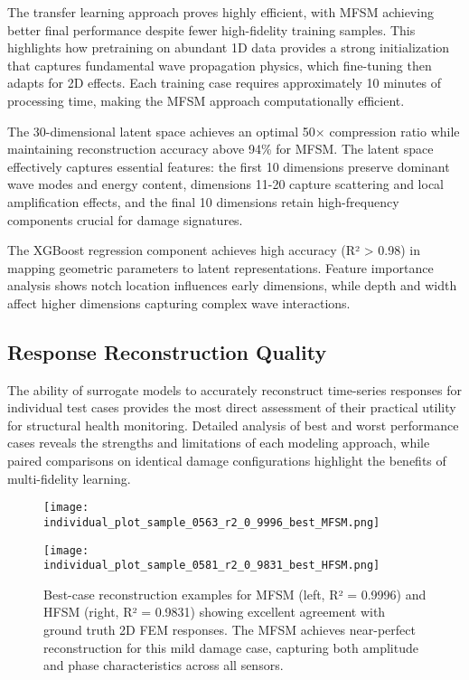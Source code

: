 \documentclass[12pt,a4paper]{report}
\begin{document}
The transfer learning approach proves highly efficient, with MFSM achieving better final performance despite fewer high-fidelity training samples. This highlights how pretraining on abundant 1D data provides a strong initialization that captures fundamental wave propagation physics, which fine-tuning then adapts for 2D effects. Each training case requires approximately 10 minutes of processing time, making the MFSM approach computationally efficient.

The 30-dimensional latent space achieves an optimal 50× compression ratio while maintaining reconstruction accuracy above 94\% for MFSM. The latent space effectively captures essential features: the first 10 dimensions preserve dominant wave modes and energy content, dimensions 11-20 capture scattering and local amplification effects, and the final 10 dimensions retain high-frequency components crucial for damage signatures.

The XGBoost regression component achieves high accuracy (R² > 0.98) in mapping geometric parameters to latent representations. Feature importance analysis shows notch location influences early dimensions, while depth and width affect higher dimensions capturing complex wave interactions.


\subsection{Response Reconstruction Quality}

The ability of surrogate models to accurately reconstruct time-series responses for individual test cases provides the most direct assessment of their practical utility for structural health monitoring. Detailed analysis of best and worst performance cases reveals the strengths and limitations of each modeling approach, while paired comparisons on identical damage configurations highlight the benefits of multi-fidelity learning.

\begin{figure}[htbp]
\centering
\begin{minipage}{0.49\textwidth}
\centering
\texttt{[image: individual\_plot\_sample\_0563\_r2\_0\_9996\_best\_MFSM.png]}
\end{minipage}
\hfill
\begin{minipage}{0.49\textwidth}
\centering
\texttt{[image: individual\_plot\_sample\_0581\_r2\_0\_9831\_best\_HFSM.png]}
\end{minipage}
\caption{Best-case reconstruction examples for MFSM (left, R² = 0.9996) and HFSM (right, R² = 0.9831) showing excellent agreement with ground truth 2D FEM responses. The MFSM achieves near-perfect reconstruction for this mild damage case, capturing both amplitude and phase characteristics across all sensors.}
\label{fig:best_reconstructions}
\end{figure}
\end{document}
